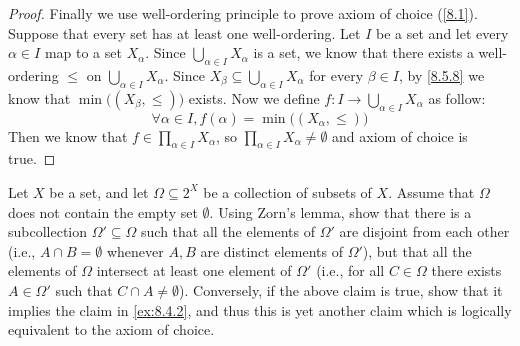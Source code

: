 \begin{proof}
  Finally we use well-ordering principle to prove axiom of choice (\cref{8.1}).
  Suppose that every set has at least one well-ordering.
  Let \(I\) be a set and let every \(\alpha \in I\) map to a set \(X_{\alpha}\).
  Since \(\bigcup_{\alpha \in I} X_{\alpha}\) is a set, we know that there exists a well-ordering \(\leq\) on \(\bigcup_{\alpha \in I} X_{\alpha}\).
  Since \(X_{\beta} \subseteq \bigcup_{\alpha \in I} X_{\alpha}\) for every \(\beta \in I\), by \cref{8.5.8} we know that \(\min\big((X_{\beta}, \leq)\big)\) exists.
  Now we define \(f : I \to \bigcup_{\alpha \in I} X_{\alpha}\) as follow:
  \[
    \forall \alpha \in I, f(\alpha) = \min\big((X_{\alpha}, \leq)\big)
  \]
  Then we know that \(f \in \prod_{\alpha \in I} X_{\alpha}\), so \(\prod_{\alpha \in I} X_{\alpha} \neq \emptyset\) and axiom of choice is true.
\end{proof}

\begin{ex}\label{ex:8.5.20}
  Let \(X\) be a set, and let \(\Omega \subseteq 2^X\) be a collection of subsets of \(X\).
  Assume that \(\Omega\) does not contain the empty set \(\emptyset\).
  Using Zorn's lemma, show that there is a subcollection \(\Omega' \subseteq \Omega\) such that all the elements of \(\Omega'\) are disjoint from each other (i.e., \(A \cap B = \emptyset\) whenever \(A, B\) are distinct elements of \(\Omega'\)), but that all the elements of \(\Omega\) intersect at least one element of \(\Omega'\) (i.e., for all \(C \in \Omega\) there exists \(A \in \Omega'\) such that \(C \cap A \neq \emptyset\)).
  Conversely, if the above claim is true, show that it implies the claim in \cref{ex:8.4.2}, and thus this is yet another claim which is logically equivalent to the axiom of choice.
\end{ex}

